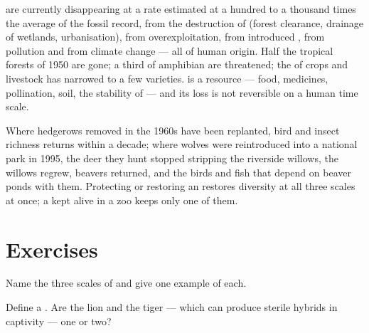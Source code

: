 \begin{proposition}\label{prop:g10:biodiversity-scales:present}
 are currently disappearing at a rate estimated at a hundred to
a thousand times the average of the fossil record, from the
destruction of  (forest clearance, drainage of wetlands,
urbanisation), from overexploitation, from introduced , from
pollution and from climate change --- all of human origin. Half the
tropical forests of 1950 are gone; a third of amphibian  are
threatened; the  of crops and livestock has narrowed
to a few varieties.  is a resource --- food, medicines,
pollination, soil, the stability of  --- and its loss is not
reversible on a human time scale.
\end{proposition}
\admitted

\begin{example}\label{ex:g10:biodiversity-scales:reversing}
Where hedgerows removed in the 1960s have been replanted, bird and
insect richness returns within a decade; where wolves were reintroduced
into a national park in 1995, the deer they hunt stopped stripping the
riverside willows, the willows regrew, beavers returned, and the
birds and fish that depend on beaver ponds with them. Protecting or
restoring an  restores diversity at all three scales at once;
a  kept alive in a zoo keeps only one of them.
\end{example}

\section{Exercises}

\begin{exercise}[$\star$]\label{exo:g10:biodiversity-scales:1}
Name the three scales of  and give one example of each.
\end{exercise}

\begin{exercise}[$\star$]\label{exo:g10:biodiversity-scales:2}
Define a . Are the lion and the tiger --- which can produce
sterile hybrids in captivity --- one  or two?
\end{exercise}

